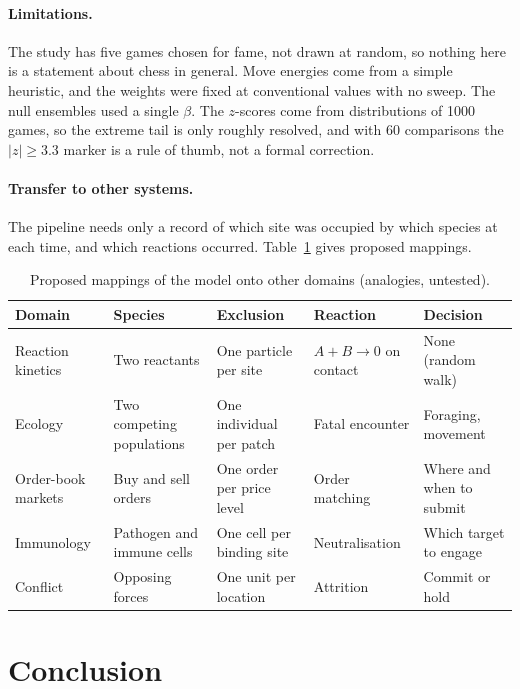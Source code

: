 \documentclass[11pt,a4paper]{article}
\begin{document}
\paragraph{Limitations.} The study has five games chosen for fame, not drawn at random, so nothing here is a statement about chess in general. Move energies come from a simple heuristic, and the weights were fixed at conventional values with no sweep. The null ensembles used a single $\beta$. The $z$-scores come from distributions of 1000 games, so the extreme tail is only roughly resolved, and with 60 comparisons the $|z|\ge3.3$ marker is a rule of thumb, not a formal correction.

\paragraph{Transfer to other systems.} The pipeline needs only a record of which site was occupied by which species at each time, and which reactions occurred. Table~\ref{tab:map} gives proposed mappings. 

\begin{table}[t]
\centering
\caption{Proposed mappings of the model onto other domains (analogies, untested).}\label{tab:map}
\small
\begin{tabular}{p{}p{}p{}p{}p{}}
\toprule
Domain & Species & Exclusion & Reaction & Decision \\
\midrule
Reaction kinetics & Two reactants & One particle per site & $A+B\to0$ on contact & None (random walk) \\
Ecology & Two competing populations & One individual per patch & Fatal encounter & Foraging, movement \\
Order-book markets & Buy and sell orders & One order per price level & Order matching & Where and when to submit \\
Immunology & Pathogen and immune cells & One cell per binding site & Neutralisation & Which target to engage \\
Conflict & Opposing forces & One unit per location & Attrition & Commit or hold \\
\bottomrule
\end{tabular}
\end{table}
\section{Conclusion}\label{sec:conclusion}
\end{document}
